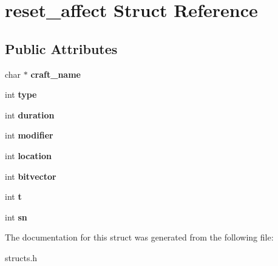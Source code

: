 \hypertarget{structreset__affect}{\section{reset\-\_\-affect Struct Reference}
\label{structreset__affect}
}
\subsection*{Public Attributes}
\begin{DoxyCompactItemize}
\item 
\hypertarget{structreset__affect_a61c538541fb1ef9ffacfd7731ae08ee7}{char $\ast$ {\bfseries craft\-\_\-name}}\label{structreset__affect_a61c538541fb1ef9ffacfd7731ae08ee7}

\item 
\hypertarget{structreset__affect_a1b74a5ae3578173fe2d55ab808f9207f}{int {\bfseries type}}\label{structreset__affect_a1b74a5ae3578173fe2d55ab808f9207f}

\item 
\hypertarget{structreset__affect_a01a8e81b7880c8db9328cc462b7d8029}{int {\bfseries duration}}\label{structreset__affect_a01a8e81b7880c8db9328cc462b7d8029}

\item 
\hypertarget{structreset__affect_adb8f987e55f7bd4a19a663c6effe7225}{int {\bfseries modifier}}\label{structreset__affect_adb8f987e55f7bd4a19a663c6effe7225}

\item 
\hypertarget{structreset__affect_abfd511fc5622a26993ef720fbef8f271}{int {\bfseries location}}\label{structreset__affect_abfd511fc5622a26993ef720fbef8f271}

\item 
\hypertarget{structreset__affect_a23b9ab03dfb7baa3268278061635e3a4}{int {\bfseries bitvector}}\label{structreset__affect_a23b9ab03dfb7baa3268278061635e3a4}

\item 
\hypertarget{structreset__affect_aa283ebf1baee01cf7523732d45248fbe}{int {\bfseries t}}\label{structreset__affect_aa283ebf1baee01cf7523732d45248fbe}

\item 
\hypertarget{structreset__affect_aefffebaff8fd9c83f154b8cda8f85deb}{int {\bfseries sn}}\label{structreset__affect_aefffebaff8fd9c83f154b8cda8f85deb}

\end{DoxyCompactItemize}


The documentation for this struct was generated from the following file\-:\begin{DoxyCompactItemize}
\item 
structs.\-h\end{DoxyCompactItemize}
